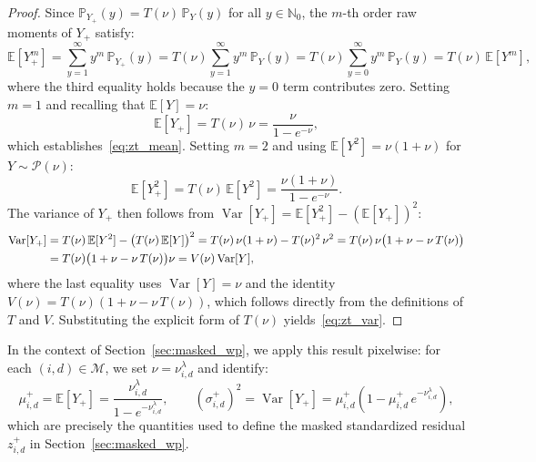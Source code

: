 \documentclass[letterpaper]{article}
\begin{document}
\begin{proof}
Since $\mathbb{P}_{Y_+}(y) = T(\nu)\,\mathbb{P}_Y(y)$ for all $y \in \mathbb{N}_0$, the 
$m$-th order raw moments of $Y_+$ satisfy:
\begin{equation}
    \mathbb{E}[Y_+^m] = \sum_{y=1}^{\infty} y^m\,\mathbb{P}_{Y_+}(y) 
    = T(\nu)\sum_{y=1}^{\infty} y^m\,\mathbb{P}_Y(y) 
    = T(\nu)\sum_{y=0}^{\infty} y^m\,\mathbb{P}_Y(y) 
    = T(\nu)\,\mathbb{E}[Y^m],
\end{equation}
where the third equality holds because the $y=0$ term contributes zero. Setting $m=1$ 
and recalling that $\mathbb{E}[Y] = \nu$:
\begin{equation}
    \mathbb{E}[Y_+] = T(\nu)\,\nu = \frac{\nu}{1 - e^{-\nu}},
\end{equation}
which establishes~\eqref{eq:zt_mean}. Setting $m=2$ and using $\mathbb{E}[Y^2] = 
\nu(1+\nu)$ for $Y\sim\mathcal{P}(\nu)$:
\begin{equation}
    \mathbb{E}[Y_+^2] = T(\nu)\,\mathbb{E}[Y^2] = \frac{\nu(1+\nu)}{1 - e^{-\nu}}.
\end{equation}
The variance of $Y_+$ then follows from $\operatorname{Var}[Y_+] = \mathbb{E}[Y_+^2] - 
(\mathbb{E}[Y_+])^2$:
\begin{align}
    \operatorname{Var}[Y_+] 
    &= T(\nu)\,\mathbb{E}[Y^2] - \bigl(T(\nu)\,\mathbb{E}[Y]\bigr)^2 = T(\nu)\,\nu(1+\nu) - T(\nu)^2\,\nu^2 \notag= T(\nu)\,\nu\bigl(1 + \nu - \nu\,T(\nu)\bigr) \notag\\
    &= T(\nu)\bigl(1 + \nu - \nu\,T(\nu)\bigr)\nu = V(\nu)\operatorname{Var}[Y],
\end{align}
where the last equality uses $\operatorname{Var}[Y] = \nu$ and the identity 
$V(\nu) = T(\nu)(1 + \nu - \nu\,T(\nu))$, which follows directly from the definitions 
of $T$ and $V$. Substituting the explicit form of $T(\nu)$ yields~\eqref{eq:zt_var}.
\end{proof}

In the context of Section~\ref{sec:masked_wp}, we apply this result pixelwise: for each 
$(i,d) \in \mathcal{M}$, we set $\nu = \nu_{i,d}^\lambda$ and identify:
\begin{equation}
    \mu_{i,d}^+ = \mathbb{E}[Y_+] = \frac{\nu_{i,d}^\lambda}{1 - e^{-\nu_{i,d}^\lambda}},
    \qquad
    (\sigma_{i,d}^+)^2 = \operatorname{Var}[Y_+] 
    = \mu_{i,d}^+\!\left(1 - \mu_{i,d}^+\,e^{-\nu_{i,d}^\lambda}\right),
\end{equation}
which are precisely the quantities used to define the masked standardized residual 
$z_{i,d}^+$ in Section~\ref{sec:masked_wp}.
\end{document}
